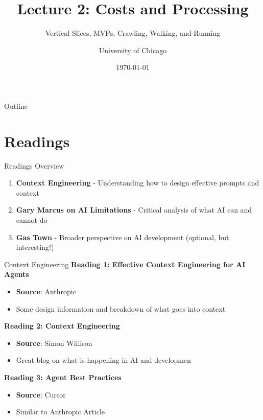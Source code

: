 \documentclass[aspectratio=169]{beamer}
\title{Lecture 2: Costs and Processing}
\subtitle{Vertical Slices, MVPs, Crawling, Walking, and Running}
\author{University of Chicago}
\date{\today}
\begin{document}
\frame{\titlepage}

\begin{frame}{Outline}
  \tableofcontents
\end{frame}

\section{Readings}

\begin{frame}{Readings Overview}
\vspace{0.3cm}

\begin{enumerate}
    \item \textbf{Context Engineering} - Understanding how to design effective prompts and context
    \item \textbf{Gary Marcus on AI Limitations} - Critical analysis of what AI can and cannot do
    \item \textbf{Gas Town} - Broader perspective on AI development (optional, but interesting!)
\end{enumerate}
\end{frame}


\begin{frame}{Context Engineering}
\textbf{Reading 1: Effective Context Engineering for AI Agents}
\begin{itemize}
    \item \textbf{Source}: Anthropic
    \item Some design information and breakdown of what goes into context
\end{itemize}
\vspace{0.2cm}

\textbf{Reading 2: Context Engineering}
\begin{itemize}
    \item \textbf{Source}: Simon Willison
    \item Great blog on what is happening in AI and developmen
\end{itemize}
\vspace{0.2cm}

\textbf{Reading 3: Agent Best Practices}
\begin{itemize}
    \item \textbf{Source}: Cursor
    \item Similar to Anthropic Article
\end{itemize}
\end{frame}
\end{document}
